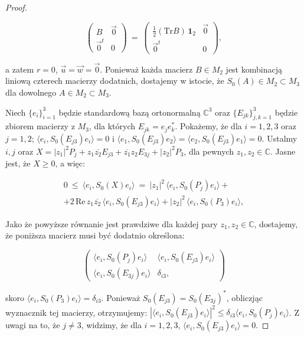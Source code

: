 {\begin{proof}
\begin{linenomath*}
\begin{equation}
\begin{pmatrix}
               B & \vec{0} \\ \vec{0}^{t} & 0
              \end{pmatrix} \: = \:
 \begin{pmatrix}
  \frac{1}{2} (\text{Tr} B) \, \mathbf{1}_{2} & \vec{0} \\ \vec{0}^{t} & 0
 \end{pmatrix},
 \end{equation}
\end{linenomath*}
a zatem $r=0$, $\vec{u}=\vec{w}=\vec{0}$.
Ponieważ każda macierz $B \in M_{2}$ jest kombinacją liniową czterech macierzy
dodatnich, dostajemy w istocie, że
$S_{0}(A) \in M_{2} \! \subset \! M_{3}$
dla dowolnego $A \in M_{2} \! \subset \! M_{3}$.

Niech $\{e_{i}\}_{i=1}^{3}$ będzie standardową
bazą ortonormalną $\mathbb{C}^{3}$
oraz $\{ E_{jk} \}_{j,k=1}^{3}$ będzie zbiorem macierzy z $M_{3}$,
dla których $E_{jk} = e_{j} e_{k}^{*}$.
Pokażemy, że dla $i = 1,2,3$ oraz $j=1,2$;
$\langle e_{i}, S_{0}(E_{j3}) e_{i} \rangle = 0$
i $\langle e_{1}, S_{0}(E_{j3}) e_{2} \rangle =
    \langle e_{2}, S_{0}(E_{j3}) e_{1} \rangle = 0$.
Ustalmy $i,j$ oraz
$X = |z_{1}|^{2} P_{j} + z_{1} \overline{z_{2}} E_{j3} +
\overline{z_{1}} z_{2} E_{3j} + |z_{2}|^{2} P_{3}$,
dla pewnych $z_{1}, z_{2} \in \mathbb{C}$.
Jasne jest, że $X \geq 0$, a więc:
\begin{linenomath*}
 \begin{multline}
0 \: \leq \: \langle e_{i}, S_{0}(X) e_{i} \rangle \: = \:
|z_{1}|^{2} \, \langle e_{i}, S_{0}(P_{j}) e_{i} \rangle +\\
+ 2 \, \text{Re} \, z_{1} \overline{z_{2}} \,
    \langle e_{i}, S_{0}(E_{j3}) e_{i} \rangle +
|z_{2}|^{2} \, \langle e_{i}, S_{0}(P_{3}) e_{i} \rangle,
 \end{multline}
\end{linenomath*}
Jako że powyższe równanie jest prawdziwe dla każdej pary
$z_{1}, z_{2} \in \mathbb{C}$,
dostajemy, że poniższa macierz musi być dodatnio określona:
\begin{linenomath*}
\begin{equation}
  \begin{pmatrix}
    \langle e_{i}, S_{0}(P_{j}) e_{i} \rangle & \langle e_{i}, S_{0}(E_{j3}) e_{i} \rangle \\
    \langle e_{i}, S_{0}(E_{3j}) e_{i} \rangle & \delta_{i3},
  \end{pmatrix}
\end{equation}
\end{linenomath*}
skoro $\langle e_{i}, S_{0}(P_{3}) e_{i} \rangle = \delta_{i3}$.
Ponieważ $S_{0}(E_{j3}) = S_{0}(E_{3j})^{*}$,
obliczjąc wyznacznik tej macierzy, otrzymujemy:
$ | \langle e_{i}, S_{0}(E_{j3}) e_{i} \rangle |^{2} \leq \delta_{i3} \langle e_{i}, S_{0}(P_{j}) e_{i} \rangle$.
Z uwagi na to, że $j \neq 3$,
widzimy, że dla $i = 1,2,3$, $\langle e_{i}, S_{0}(E_{j3}) e_{i} \rangle = 0$.


\end{proof}}

